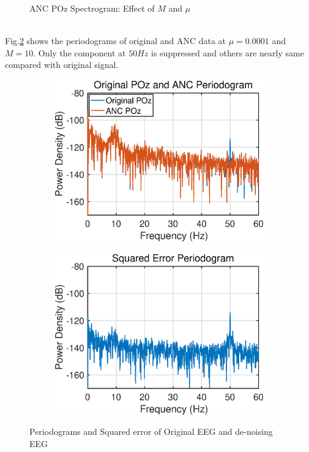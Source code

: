 \begin{figure}[htb]
\begin{subfigure}[b]{0.32\textwidth}
    \end{subfigure}
    \caption{ANC POz Spectrogram: Effect of $M$ and $\mu$}
    \label{fig:2_3_d2}
\end{figure}\\
Fig.\ref{fig:2_3_d3} shows the periodograms of original and ANC data at $\mu=0.0001$ and $M=10$. Only the component at $50Hz$ is suppressed and others are nearly same compared with original signal.
\begin{figure}[htb]
    \centering
    \hspace{-0.4cm}
    \begin{subfigure}[b]{0.35\textwidth}
     \centering
     \includegraphics[width=\textwidth]{fig/23/23d11.eps}
    \end{subfigure}
    \hspace{-0.4cm}
    \begin{subfigure}[b]{0.35\textwidth}
     \centering
     \includegraphics[width=\textwidth]{fig/23/23d12.eps}
    \end{subfigure}  
    \caption{Periodograms and Squared error of Original EEG and de-noising EEG}
    \label{fig:2_3_d3}
\end{figure}



